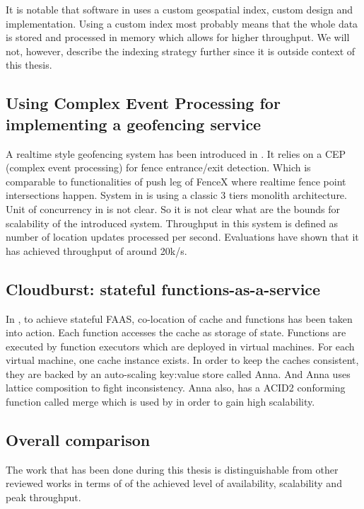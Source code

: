 \documentclass[a4]{report}
\begin{document}
    It is notable that software in \cite{Cirillo-Jacobs-Martin-Szczytowski-2014} uses a custom geospatial index,
    custom design and implementation.
    Using a custom index most probably means that the whole data is stored and processed in memory which allows for
    higher throughput.
    We will not, however, describe the indexing strategy further since it is outside context of this thesis.

    \subsection{Using Complex Event Processing for implementing a geofencing service}
    A realtime style geofencing system has been introduced in \cite{Nechifor_Comnac_2013}.
    It relies on a CEP (complex event processing) for fence entrance/exit detection.
    Which is comparable to functionalities of push leg of FenceX where realtime fence point intersections happen.
    System in \cite{Nechifor_Comnac_2013} is using a classic 3 tiers monolith architecture.
    Unit of concurrency in \cite{Nechifor_Comnac_2013} is not clear.
    So it is not clear what are the bounds for scalability of the introduced system.
    Throughput in this system is defined as number of location updates processed per second.
    Evaluations have shown that it has achieved throughput of around 20k/s.

    \subsection{Cloudburst: stateful functions-as-a-service}
    In \cite{Functions-as-a-Service-2020}, to achieve stateful FAAS, co-location of cache and functions has been
    taken into action.
    Each function accesses the cache as storage of state.
    Functions are executed by function executors which are deployed in virtual machines.
    For each virtual machine, one cache instance exists.
    In order to keep the caches consistent, they are backed by an auto-scaling key:value store called Anna.
    And Anna uses lattice composition to fight inconsistency.
    Anna also, has a ACID2 conforming function called merge which is used by \cite{Functions-as-a-Service-2020} in
    order to gain high scalability.

    \subsection{Overall comparison}
    The work that has been done during this thesis is distinguishable from other reviewed works in terms of
    of the achieved level of availability, scalability and peak throughput.
\end{document}
